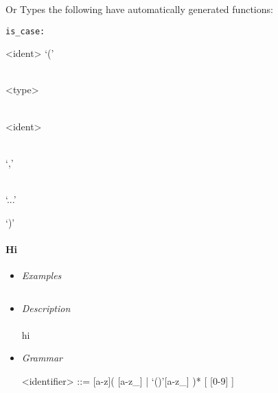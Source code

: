 \documentclass{article}
\def\H{Haskell}
\def\pend{\mbox{} \\\\}
\begin{document}
Or Types the following have automatically generated functions:

\begin{verbatim}
is_case:
\end{verbatim}

%


%


\begin{syntdiag}
<ident> ‘(’
\begin{rep} \begin{stack} \\
<type> \begin{stack} \\ <ident> \end{stack}
\end{stack} \\ ‘,’ \end{rep}
\begin{stack} \\ ‘...’ \end{stack} ‘)’
\end{syntdiag}

\paragraph{Hi}

\begin{itemize}

\item \textit{Examples}
\begin{verbatim}
\end{verbatim}

\item \textit{Description} \\\\
hi

\item \textit{Grammar}
\begin{grammar}
<identifier> ::= [a-z]( [a-z_] | `()'[a-z_] )* [ [0-9] ]
\end{grammar}

\end{itemize}
\end{document}
